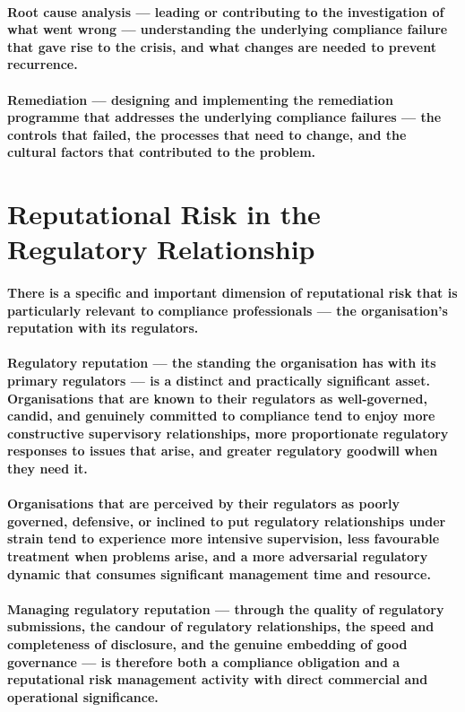 \paragraph{\textbf{Root cause analysis} — leading or contributing to the investigation of what went wrong — understanding the underlying compliance failure that gave rise to the crisis, and what changes are needed to prevent recurrence.}
\paragraph{\textbf{Remediation} — designing and implementing the remediation programme that addresses the underlying compliance failures — the controls that failed, the processes that need to change, and the cultural factors that contributed to the problem.}

\section{Reputational Risk in the Regulatory Relationship}
\paragraph{There is a specific and important dimension of reputational risk that is particularly relevant to compliance professionals — the organisation's reputation with its regulators.}
\paragraph{Regulatory reputation — the standing the organisation has with its primary regulators — is a distinct and practically significant asset. Organisations that are known to their regulators as well-governed, candid, and genuinely committed to compliance tend to enjoy more constructive supervisory relationships, more proportionate regulatory responses to issues that arise, and greater regulatory goodwill when they need it.}
\paragraph{Organisations that are perceived by their regulators as poorly governed, defensive, or inclined to put regulatory relationships under strain tend to experience more intensive supervision, less favourable treatment when problems arise, and a more adversarial regulatory dynamic that consumes significant management time and resource.}
\paragraph{Managing regulatory reputation — through the quality of regulatory submissions, the candour of regulatory relationships, the speed and completeness of disclosure, and the genuine embedding of good governance — is therefore both a compliance obligation and a reputational risk management activity with direct commercial and operational significance.}
